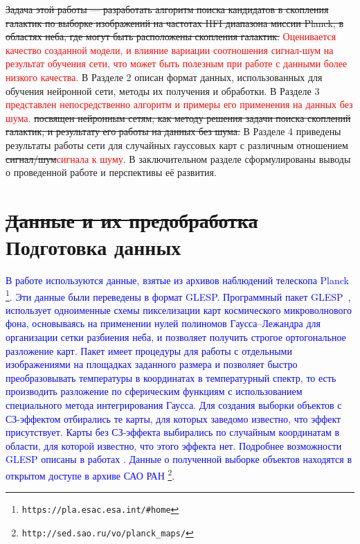 \documentclass[
aps,%
12pt,%
final,%
notitlepage,%
oneside,%
onecolumn,%
nobibnotes,%
nofootinbib,%
superscriptaddress,%
noshowpacs,%
centertags]%
{revtex4}
\begin{document}
\sout{Задача этой работы --- разработать алгоритм поиска кандидатов в скопления галактик по выборке изображений на частотах HFI диапазона миссии Planck, в областях неба, где могут быть расположены скопления галактик.} \textcolor{red}{Оценивается качество созданной модели, и влияние вариации соотношения сигнал-шум на результат обучения сети, что может быть полезным при работе с данными более низкого качества.} В Разделе 2 описан формат данных, использованных для обучения нейронной сети, методы их получения и обработки. В Разделе 3 \textcolor{red}{представлен непосредственно алгоритм и примеры его применения на данных без шума.} \sout{посвящен нейронным сетям, как методу решения задачи поиска скоплений галактик, и результату его работы на данных без шума.} В Разделе 4 приведены результаты работы сети для случайных гауссовых карт с различным отношением \sout{сигнал/шум}\textcolor{red}{сигнала к шуму}. В заключительном разделе сформулированы выводы о проведенной работе и перспективы её развития.

\section{\sout{Данные и их предобработка} Подготовка данных}
\label{sec:data}
\textcolor{blue}{В работе используются данные, взятые из архивов наблюдений телескопа Planck \footnote{\tt https://pla.esac.esa.int/\#home}. Эти данные были переведены в формат GLESP. Программный пакет GLESP~\cite{glesp1}, использует одноименные схемы пикселизации карт космического микроволнового фона, основываясь на применении нулей полиномов Гаусса--Лежандра для организации сетки разбиения неба, и позволяет получить строгое ортогональное разложение карт. Пакет имеет процедуры для работы с отдельными изображениями на площадках заданного размера  и позволяет быстро преобразовывать температуры в координатах в температурный спектр, то есть производить разложение по сферическим функциям с использованием специального метода интегрирования Гаусса. Для создания выборки объектов с СЗ-эффектом отбирались те карты, для которых заведомо известно, что эффект присутствует. Карты без СЗ-эффекта выбирались по случайным координатам в области, для которой известно, что этого эффекта нет. Подробнее возможности GLESP описаны в работах \cite{glesp1,glesp3}. Данные о полученной выборке объектов находятся в открытом доступе в архиве САО РАН \footnote{\tt http://sed.sao.ru/vo/planck\_maps/}}. 
\end{document}
